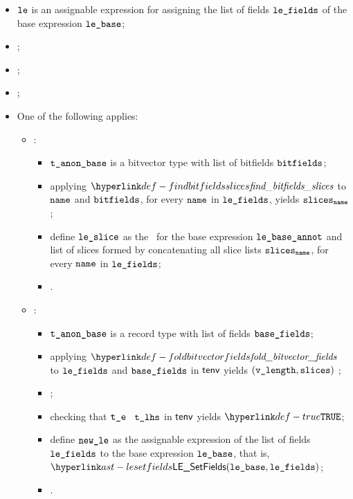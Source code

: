 \begin{itemize}
  \item $\texttt{le}$ is an assignable expression for assigning the list of fields $\texttt{le\_fields}$ of the base
        expression $\lebase$;
  \item {}\ProseOrTypeError;
  \item \Proseannotatelexpr{$\tenv$}{$\lebase$}{$\tbase$}{$(\lebaseannot, \vsesbase)$}\ProseOrTypeError;
  \item \Prosemakeanonymous{$\tenv$}{$\tbase$}{\\ $\tbaseanon$}\ProseOrTypeError;
  \item One of the following applies:
  \begin{itemize}
    \item {}:
    \begin{itemize}
      \item $\texttt{t\_anon\_base}$ is a bitvector type with list of bitfields $\texttt{bitfields}$;
      \item applying $\findbitfieldsslices$ to $\texttt{name}$ and $\texttt{bitfields}$, for every $\texttt{name}$ in $\texttt{le\_fields}$, yields $\texttt{slices}_{\texttt{name}}$\ProseOrTypeError;
      \item define $\vleslice$ as the \ProseLESlice\ for the base expression $\texttt{le\_base\_annot}$ and list of slices formed by concatenating all
            slice lists $\texttt{slices}_{\texttt{name}}$, for every $\texttt{name}$ in $\texttt{le\_fields}$;
      \item \Proseannotatelexpr{$\tenv$}{$\vleslice$}{$\vte$}{$(\newle, \vses)$}\ProseOrTypeError.
    \end{itemize}

    \item {}:
    \begin{itemize}
      \item $\texttt{t\_anon\_base}$ is a record type with list of fields $\texttt{base\_fields}$;
      \item applying $\foldbitvectorfields$ to $\texttt{le\_fields}$ and $\texttt{base\_fields}$ in $\tenv$ yields $(\texttt{v\_length}, \texttt{slices})$ \ProseOrTypeError;
      \item {};
      \item checking that $\vte$ \typesatisfies\ $\texttt{t\_lhs}$ in $\tenv$ yields $\True$\ProseOrTypeError;
      \item define $\texttt{new\_le}$ as the assignable expression of the list of fields $\texttt{le\_fields}$ to the base expression $\lebase$, that is,
            $\LESetFields(\lebase, \vlefields)$;
      \item \Proseeqdef{$\vses$}{$\vsesbase$}.
    \end{itemize}


\end{itemize}
\end{itemize}
